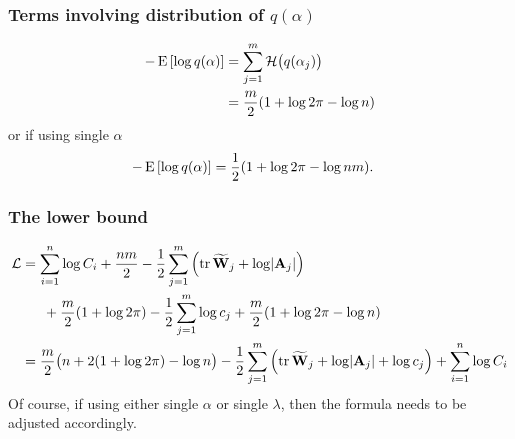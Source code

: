 \subsubsection{Terms involving distribution of $q(\alpha)$}

\begin{align*}
  -\E\left[ \log q(\alpha) \right] 
  &= \sum_{j=1}^m \cH\big(q(\alpha_j)\big) \\
  &= \half[m] (1 + \log 2\pi - \log n)
\end{align*}
or if using single $\alpha$
\begin{align*}
  -\E\left[ \log q(\alpha) \right] 
  &= \half (1 + \log 2\pi - \log nm).
\end{align*}

\subsubsection{The lower bound}

\begin{align*}
  \cL 
  &= \sum_{i=1}^n \log C_i + \half[nm] - \half \sum_{j=1}^m \left( \tr \btW_j + \log \abs{\bA_j} \right) \\
  &\phantom{==} + \half[m](1 + \log 2\pi) - \half \sum_{j=1}^m \log c_j + \half[m] (1 + \log 2\pi - \log n) \\
  &= \half[m]\big(n + 2(1 + \log 2\pi) - \log n \big)
  - \half \sum_{j=1}^m \left( \tr \btW_j + \log \abs{\bA_j} + \log c_j \right) + \sum_{i=1}^n \log C_i
\end{align*}
Of course, if using either single $\alpha$ or single $\lambda$, then the formula needs to be adjusted accordingly.
